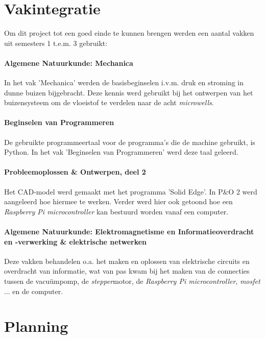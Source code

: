 \documentclass[a4paper,twoside,kulak]{kulakreport} %
\begin{document}
\clearpage

\section*{Vakintegratie}
Om dit project tot een goed einde te kunnen brengen werden een aantal vakken uit semesters 1 t.e.m. 3 gebruikt:

\paragraph{Algemene Natuurkunde: Mechanica}

In het vak 'Mechanica' werden de basisbeginselen i.v.m. druk en stroming in dunne buizen bijgebracht. Deze kennis werd gebruikt bij het ontwerpen van het buizensysteem om de vloeistof te verdelen naar de acht \textit{microwells}.

\paragraph{Beginselen van Programmeren}

De gebruikte programmeertaal voor de programma's die de machine gebruikt, is Python. In het vak 'Beginselen van Programmeren' werd deze taal geleerd. 

\paragraph{Probleemoplossen \& Ontwerpen, deel 2}

Het CAD-model werd gemaakt met het programma 'Solid Edge'. In P\&O 2 werd aangeleerd hoe hiermee te werken. Verder werd hier ook getoond hoe een \textit{Raspberry Pi microcontroller} kan bestuurd worden vanaf een computer. 

\paragraph{Algemene Natuurkunde: Elektromagnetisme en Informatieoverdracht en -verwerking \& elektrische netwerken}

Deze vakken behandelen o.a. het maken en oplossen van elektrische circuits en overdracht van informatie, wat van pas kwam bij het maken van de connecties tussen de vacuümpomp, de \textit{stepper}motor, de \textit{Raspberry Pi microcontroller}, \textit{mosfet} ... en de computer.

\clearpage

\section*{Planning}
\end{document}

